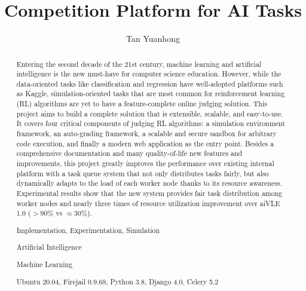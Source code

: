 \documentclass[fyp]{socreport}
\begin{document}
\title{Competition Platform for AI Tasks}
\author{Tan Yuanhong}
\maketitle
\begin{abstract}
Entering the second decade of the 21st century, machine learning and artificial intelligence is the new must-have for computer science education. However, while the data-oriented tasks like classification and regression have well-adopted platforms such as Kaggle, simulation-oriented tasks that are most common for reinforcement learning (RL) algorithms are yet to have a feature-complete online judging solution. This project aims to build a complete solution that is extensible, scalable, and easy-to-use. It covers four critical components of judging RL algorithms: a simulation environment framework, an auto-grading framework, a scalable and secure sandbox for arbitrary code execution, and finally a modern web application as the entry point. Besides a comprehensive documentation and many quality-of-life new features and improvements, this project greatly improves the performance over existing internal platform with a task queue system that not only distributes tasks fairly, but also dynamically adapts to the load of each worker node thanks to its resource awareness. Experimental results show that the new system provides fair task distribution among worker nodes and nearly three times of resource utilization improvement over aiVLE 1.0 ($>90\%$ vs $\approx 30\%$).

\begin{project-nature}
	Implementation, Experimentation, Simulation
\end{project-nature}
\begin{keywords}
    \item Artificial Intelligence
	\item Machine Learning
\end{keywords}
\begin{implement}
	Ubuntu 20.04, Firejail 0.9.68, Python 3.8, Django 4.0, Celery 5.2
\end{implement}

\end{abstract}
\end{document}
